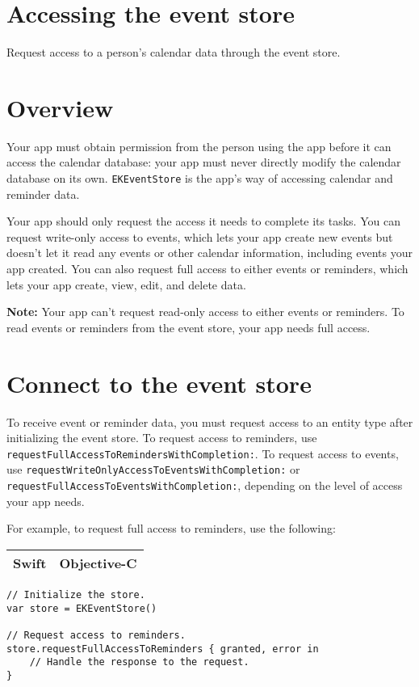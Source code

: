 \documentclass{article}
\title{}
\author{}
\date{}
\begin{document}
\section*{Accessing the event store}
Request access to a person's calendar data through the event store.

\section*{Overview}
Your app must obtain permission from the person using the app before it can access the calendar database: your app must never directly modify the calendar database on its own. \texttt{EKEventStore} is the app's way of accessing calendar and reminder data.

Your app should only request the access it needs to complete its tasks. You can request write-only access to events, which lets your app create new events but doesn't let it read any events or other calendar information, including events your app created. You can also request full access to either events or reminders, which lets your app create, view, edit, and delete data.

\textbf{Note:} Your app can't request read-only access to either events or reminders. To read events or reminders from the event store, your app needs full access.

\section*{Connect to the event store}
To receive event or reminder data, you must request access to an entity type after initializing the event store. To request access to reminders, use \texttt{requestFullAccessToRemindersWithCompletion:}. To request access to events, use \texttt{requestWriteOnlyAccessToEventsWithCompletion:} or \texttt{requestFullAccessToEventsWithCompletion:}, depending on the level of access your app needs.

For example, to request full access to reminders, use the following:

\bigskip
\begin{tabular}{ll}
Swift & Objective-C \\
\hline
\end{tabular}

\begin{verbatim}
// Initialize the store.
var store = EKEventStore()

// Request access to reminders.
store.requestFullAccessToReminders { granted, error in
    // Handle the response to the request.
}
\end{verbatim}
\end{document}
